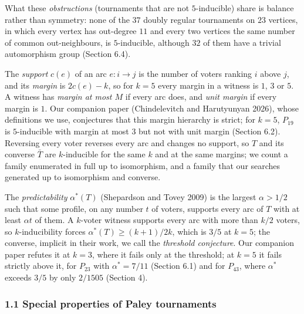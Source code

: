 \documentclass[
]{article}
\newcounter{none} %
\begin{document}

What these \emph{obstructions} (tournaments that are not
\(5\)-inducible) share is balance rather than symmetry: none of the
\(37\) doubly regular tournaments on \(23\) vertices, in which every
vertex has out-degree \(11\) and every two vertices the same number of
common out-neighbours, is \(5\)-inducible, although \(32\) of them have
a trivial automorphism group (Section 6.4).

The \emph{support} \(c(e)\) of an arc \(e: i \to j\) is the number of
voters ranking \(i\) above \(j\), and its \emph{margin} is
\(2c(e) - k\), so for \(k = 5\) every margin in a witness is \(1\),
\(3\) or \(5\). A witness has \emph{margin at most \(M\)} if every arc
does, and \emph{unit margin} if every margin is \(1\). Our companion
paper (Chindelevitch and Harutyunyan 2026), whose definitions we use,
conjectures that this margin hierarchy is strict; for \(k = 5\),
\(P_{19}\) is \(5\)-inducible with margin at most \(3\) but not with
unit margin (Section 6.2). Reversing every voter reverses every arc and
changes no support, so \(T\) and its converse \(\bar{T}\) are
\(k\)-inducible for the same \(k\) and at the same margins; we count a
family enumerated in full up to isomorphism, and a family that our
searches generated up to isomorphism and converse.

The \emph{predictability} \(\alpha^{*}(T)\) (Shepardson and Tovey 2009)
is the largest \(\alpha > 1/2\) such that some profile, on any number
\(t\) of voters, supports every arc of \(T\) with at least \(\alpha t\)
of them. A \(k\)-voter witness supports every arc with more than \(k/2\)
voters, so \(k\)-inducibility forces \(\alpha^{*}(T) \ge (k+1)/2k\),
which is \(3/5\) at \(k = 5\); the converse, implicit in their work, we
call the \emph{threshold conjecture}. Our companion paper refutes it at
\(k = 3\), where it fails only at the threshold; at \(k = 5\) it fails
strictly above it, for \(P_{23}\) with \(\alpha^{*} = 7/11\) (Section
6.1) and for \(P_{43}\), where \(\alpha^{*}\) exceeds \(3/5\) by only
\(2/1505\) (Section 4).

\subsubsection{1.1 Special properties of Paley
tournaments}\label{special-properties-of-paley-tournaments}
\end{document}
